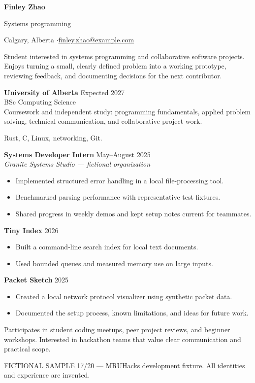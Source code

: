 
{\Huge\bfseries Finley Zhao}\par
{\large\color{accent} Systems programming}\par
Calgary, Alberta \enspace$\cdot$\enspace \href{mailto:finley.zhao@example.com}{finley.zhao@example.com}

Student interested in systems programming and collaborative software projects.
Enjoys turning a small, clearly defined problem into a working prototype,
reviewing feedback, and documenting decisions for the next contributor.

\textbf{University of Alberta} \hfill Expected 2027\\
BSc Computing Science\\
Coursework and independent study: programming fundamentals, applied problem solving,
technical communication, and collaborative project work.

Rust, C, Linux, networking, Git.

\textbf{Systems Developer Intern} \hfill May--August 2025\\
\textit{Granite Systems Studio --- fictional organization}
\begin{itemize}
\item Implemented structured error handling in a local file-processing tool.
\item Benchmarked parsing performance with representative test fixtures.
\item Shared progress in weekly demos and kept setup notes current for teammates.
\end{itemize}

\textbf{Tiny Index} \hfill 2026
\begin{itemize}
\item Built a command-line search index for local text documents.
\item Used bounded queues and measured memory use on large inputs.
\end{itemize}
\textbf{Packet Sketch} \hfill 2025
\begin{itemize}
\item Created a local network protocol visualizer using synthetic packet data.
\item Documented the setup process, known limitations, and ideas for future work.
\end{itemize}

Participates in student coding meetups, peer project reviews, and beginner workshops.
Interested in hackathon teams that value clear communication and practical scope.

\vfill
{\footnotesize\color{gray} FICTIONAL SAMPLE 17/20 --- MRUHacks development fixture.
All identities and experience are invented.}

